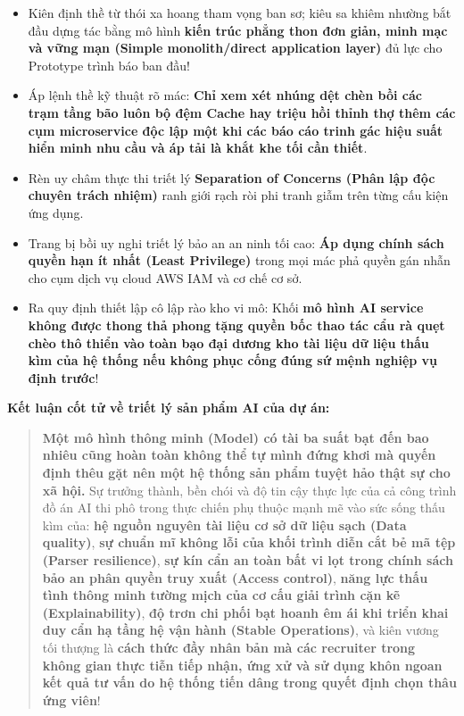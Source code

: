 \begin{itemize}
\tightlist
\item
  Kiên định thề từ thói xa hoang tham vọng ban sơ; kiêu sa khiêm nhường
  bắt đầu dựng tác bằng mô hình \textbf{kiến trúc phẳng thon đơn giản,
  minh mạc và vững mạn (Simple monolith/direct application layer)} đủ
  lực cho Prototype trình báo ban đầu!
\item
  Áp lệnh thề kỹ thuật rõ mác: \textbf{Chỉ xem xét nhúng dệt chèn bồi
  các trạm tầng bão luôn bộ đệm Cache hay triệu hồi thỉnh thợ thêm các
  cụm microservice độc lập một khi các báo cáo trinh gác hiệu suất hiển
  minh nhu cầu và áp tải là khắt khe tối cần thiết}.
\item
  Rèn uy châm thực thi triết lý \textbf{Separation of Concerns (Phân lập
  độc chuyên trách nhiệm)} ranh giới rạch ròi phi tranh giẫm trên từng
  cấu kiện ứng dụng.
\item
  Trang bị bồi uy nghi triết lý bảo an an ninh tối cao: \textbf{Áp dụng
  chính sách quyền hạn ít nhất (Least Privilege)} trong mọi mác phả
  quyền gán nhẫn cho cụm dịch vụ cloud AWS IAM và cơ chế cơ sở.
\item
  Ra quy định thiết lập cô lập rào kho vi mô: Khối \textbf{mô hình AI
  service không được thong thả phong tặng quyền bốc thao tác cẩu rà quẹt
  chèo thô thiển vào toàn bạo đại dương kho tài liệu dữ liệu thấu kìm
  của hệ thống nếu không phục cống đúng sứ mệnh nghiệp vụ định trước}!
\end{itemize}

\vspace{0.5em}\noindent\textbf{Kết luận cốt tử về triết lý sản phẩm AI của dự
án:}\par

\begin{quote}
\textbf{Một mô hình thông minh (Model) có tài ba suất bạt đến bao nhiêu
cũng hoàn toàn không thể tự mình đứng khơi mà quyến định thêu gặt nên
một hệ thống sản phẩm tuyệt hảo thật sự cho xã hội.} Sự trưởng thành,
bền chói và độ tin cậy thực lực của cả công trình đồ án AI thi phô trong
thực chiến phụ thuộc mạnh mẽ vào sức sống thấu kìm của: \textbf{hệ nguồn
nguyên tài liệu cơ sở dữ liệu sạch (Data quality)}, \textbf{sự chuẩn mĩ
không lỗi của khối trình diễn cắt bẻ mã tệp (Parser resilience)},
\textbf{sự kín cẩn an toàn bất vi lọt trong chính sách bảo an phân quyền
truy xuất (Access control)}, \textbf{năng lực thấu tình thông minh tường
mịch của cơ cấu giải trình cặn kẽ (Explainability)}, \textbf{độ trơn chi
phối bạt hoanh êm ái khi triển khai duy cẩn hạ tầng hệ vận hành (Stable
Operations)}, và kiên vương tối thượng là \textbf{cách thức đầy nhân bản
mà các recruiter trong không gian thực tiễn tiếp nhận, ứng xử và sử dụng
khôn ngoan kết quả tư vấn do hệ thống tiến dâng trong quyết định chọn
thâu ứng viên}!
\end{quote}

